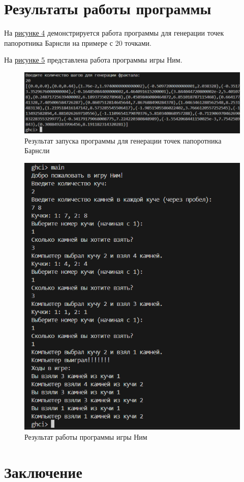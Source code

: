 \documentclass[11pt,a4paper,final]{article} %
\begin{document}
\newpage
\section{Результаты работы программы}

На \hyperref[fig:pic1]{рисунке 4} демонстрируется работа программы для генерации точек папоротника Барнсли на примере с 20 точками.

На \hyperref[fig:pic2]{рисунке 5} представлена работа программы игры Ним. 


\begin{figure}[H]
	\centering
	\includegraphics[width=0.8 \linewidth]{img/pic1.png}
	\caption{Результат запуска программы для генерации точек папоротника Барнсли}
	\label{fig:pic1}
\end{figure}

\begin{figure}[H]
	\centering
	\includegraphics[width=0.6 \linewidth]{img/pic2.png}
	\caption{Результат работы программы игры Ним}
	\label{fig:pic2}
\end{figure}


\section*{Заключение}
\end{document}
